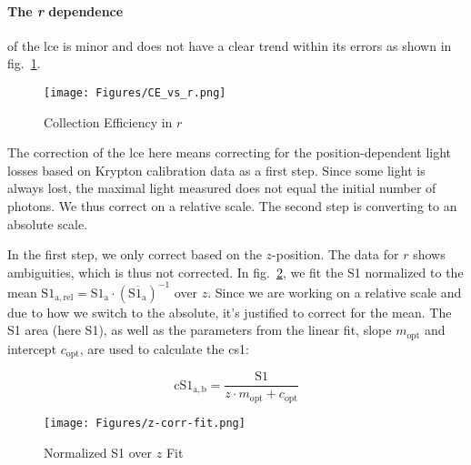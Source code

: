 \paragraph{The \emph{r} dependence} of the \gls{lce} is minor and does not have a clear trend within its errors as shown in fig.~\ref{fig:ce_vs_r}.

\begin{figure}
\centering
    \texttt{[image: Figures/CE\_vs\_r.png]}  %
\caption[Collection Efficiency in $ r $]{
    Collection Efficiency in $ r $
    }
\label{fig:ce_vs_r}
\end{figure}

The correction of the \gls{lce} here means correcting for the position-dependent light losses based on Krypton calibration data as a first step.
Since some light is always lost, the maximal light measured does not equal the initial number of photons.
We thus correct on a relative scale.
The second step is converting to an absolute scale.

In the first step, we only correct based on the $ z $-position.
The data for $ r $ shows ambiguities, which is thus not corrected.
In fig.~\ref{fig:s1area_vs_z}, we fit the S1 normalized to the mean $ \mathrm{S1_{a,rel}} = \mathrm{S1_a} \cdot \left( \overline{\mathrm{S1_a}} \right)^{-1} $ over $ z $.  %
Since we are working on a relative scale and due to how we switch to the absolute, it's justified to correct for the mean.
The S1 area (here S1), as well as the parameters from the linear fit, slope $ m_\mathrm{opt} $ and intercept $ c_\mathrm{opt} $, are used to calculate the \gls{cs1}:

\begin{equation}
    \mathrm{cS1}_\mathrm{a,b} = \frac{ \mathrm{S1} }{ z \cdot m_\mathrm{opt} + c_\mathrm{opt} }
\end{equation}

\begin{figure}
\centering
    \texttt{[image: Figures/z-corr-fit.png]}  %
\caption[Normalized S1 over $ z $ Fit]{
    Normalized S1 over $ z $ Fit
    }
\label{fig:s1area_vs_z}
\end{figure}












